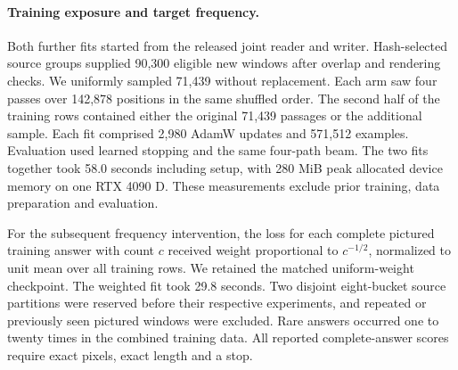 \paragraph{Training exposure and target frequency.}
Both further fits started from the released joint reader and writer. Hash-selected source groups supplied 90,300 eligible new windows after overlap and rendering checks. We uniformly sampled 71,439 without replacement. Each arm saw four passes over 142,878 positions in the same shuffled order. The second half of the training rows contained either the original 71,439 passages or the additional sample. Each fit comprised 2,980 AdamW updates and 571,512 examples. Evaluation used learned stopping and the same four-path beam. The two fits together took 58.0 seconds including setup, with 280 MiB peak allocated device memory on one RTX 4090 D. These measurements exclude prior training, data preparation and evaluation.

For the subsequent frequency intervention, the loss for each complete pictured training answer with count $c$ received weight proportional to $c^{-1/2}$, normalized to unit mean over all training rows. We retained the matched uniform-weight checkpoint. The weighted fit took 29.8 seconds. Two disjoint eight-bucket source partitions were reserved before their respective experiments, and repeated or previously seen pictured windows were excluded. Rare answers occurred one to twenty times in the combined training data. All reported complete-answer scores require exact pixels, exact length and a stop.
